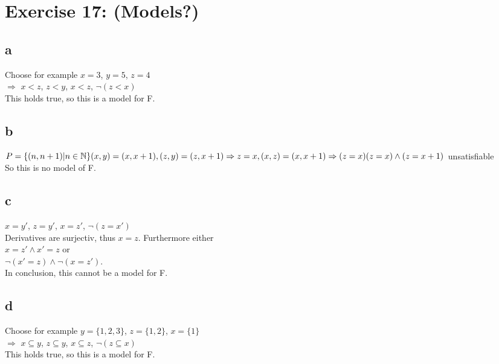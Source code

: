 \documentclass[12pt]{article}
\newcommand{\N}{\mathbb N}
\begin{document}
 

\rhead{\today}


\section*{Exercise 17: (Models?)}

\subsection*{a}

Choose for example $x=3$, $y=5$, $z=4$\\
$\Rightarrow$ $x<z$, $z<y$, $x<z$, $\lnot (z < x)$\\
This holds true, so this is a model for F.

\subsection*{b}
$P=\{(n,n+1)| n \in \N \} \\
(x,y) = (x,x+1), \\
(z,y)=(z,x+1) \Rightarrow z=x, \\
(x,z)=(x,x+1) \Rightarrow (z=x)\\
(z=x)\land(z=x+1)$ unsatisfiable\\
So this is no model of F.



\subsection*{c}

$x=y'$, $z=y'$, $x=z'$, $\lnot(z=x')$\\
Derivatives are surjectiv, thus $x=z$. Furthermore either\\
$x=z' \land x'=z$ or\\
$\lnot(x'=z) \land \lnot(x=z')$.\\
In conclusion, this cannot be a model for F.

\subsection*{d}

Choose for example $y = \{1,2,3\}$, $z=\{1,2\}$, $x=\{1\}$\\
$\Rightarrow$ $x \subseteq y$, $z \subseteq y$, $x \subseteq z$, $\lnot (z \subseteq x)$\\
This holds true, so this is a model for F.
\end{document}
